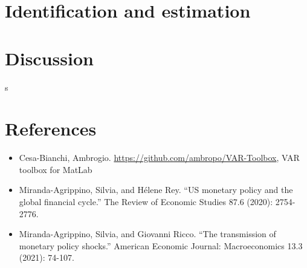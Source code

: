 \documentclass[11pt,a4paper,draft]{article}
\begin{document}
\section{Identification and estimation}



\section{Discussion}


s






\section{References}
\begin{itemize}
    \item Cesa-Bianchi, Ambrogio. \url{https://github.com/ambropo/VAR-Toolbox}, VAR toolbox for MatLab
    \item Miranda-Agrippino, Silvia, and Hélene Rey. \enquote{US monetary policy and the global financial cycle.} The Review of Economic Studies 87.6 (2020): 2754-2776.
    \item Miranda-Agrippino, Silvia, and Giovanni Ricco. \enquote{The transmission of monetary policy shocks.} American Economic Journal: Macroeconomics 13.3 (2021): 74-107.

\end{itemize}
\end{document}
